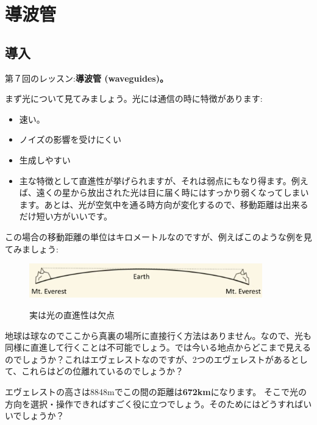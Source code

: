 \chapter[導波管]
{導波管}




\section{導入}
第７回のレッスン:\textbf{導波管 (waveguides)。}

まず光について見てみましょう。光には通信の時に特徴があります:
\begin{itemize}
    \item 速い。
    \item ノイズの影響を受けにくい
    \item 生成しやすい
    \item 主な特徴として直進性が挙げられますが、それは弱点にもなり得ます。例えば、遠くの星から放出された光は目に届く時にはすっかり弱くなってしまいます。あとは、光が空気中を通る時方向が変化するので、移動距離は出来るだけ短い方がいいです。
\end{itemize}

この場合の移動距離の単位はキロメートルなのですが、例えばこのような例を見てみましょう:
\begin{figure}[H]
    \centering
    \includegraphics[width=0.9\textwidth]{lesson7/everest.pdf}
    \label{図: 1}
    \caption{実は光の直進性は欠点}
\end{figure}
地球は球なのでここから真裏の場所に直接行く方法はありません。なので、光も同様に直進して行くことは不可能でしょう。では今いる地点からどこまで見えるのでしょうか？これはエヴェレストなのですが、2つのエヴェレストがあるとして、これらはどの位離れているのでしょうか？

エヴェレストの高さは8848mでこの間の距離は\textbf{672km}になります。
そこで光の方向を選択・操作できればすごく役に立つでしょう。そのためにはどうすればいいでしょうか？
